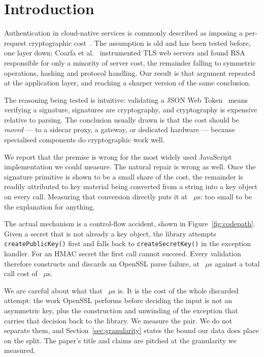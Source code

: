 \documentclass[pdflatex,sn-basic,twocolumn]{sn-jnl}%
\begin{document}
\section{Introduction}\label{sec:intro}

Authentication in cloud-native services is commonly described as imposing a
per-request cryptographic cost~\cite{zhu2023dissecting}.
The assumption is old and has been tested before, one layer down: Coarfa et
al.~\cite{coarfa2006performance} instrumented TLS web servers and found RSA
responsible for only a minority of server cost, the remainder falling to
symmetric operations, hashing and protocol handling. Our result is that
argument repeated at the application layer, and reaching a sharper version of
the same conclusion.

The reasoning being tested is intuitive: validating a JSON Web
Token~\cite{rfc7519} means verifying a signature, signatures are cryptography,
and cryptography is expensive relative to parsing. The conclusion usually drawn
is that the cost should be \emph{moved} --- to a sidecar proxy, a gateway, or
dedicated hardware --- because specialised components do cryptographic work
well.

We report that the premise is wrong for the most widely used JavaScript
implementation we could measure. The natural repair is wrong as well. Once the
signature primitive is shown to be a small share of the cost, the remainder is
readily attributed to key material being converted from a string into a key
object on every call. Measuring that conversion directly puts it at
\HostCreateSecretKey~$\mu$s: too small to be the explanation for anything.

The actual mechanism is a control-flow accident, shown in
Figure~\ref{fig:codepath}. Given a secret that is not already a key object, the
library attempts \texttt{createPublicKey()} first and falls back to
\texttt{createSecretKey()} in the exception handler. For an HMAC secret the
first call cannot succeed. Every validation therefore constructs and discards
an OpenSSL parse failure, at \HostProbeThrows~$\mu$s against a total call cost
of \HostJwtString~$\mu$s.

We are careful about what that \HostProbeThrows~$\mu$s is. It is the cost of
the whole discarded attempt: the work OpenSSL performs before deciding the
input is not an asymmetric key, plus the construction and unwinding of the
exception that carries that decision back to the library. We measure the pair.
We do not separate them, and Section~\ref{sec:granularity} states the bound our
data does place on the split. The paper's title and claims are pitched at the
granularity we measured.
\end{document}
